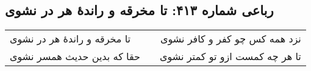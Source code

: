 \begin{center}
\section*{رباعی شماره ۴۱۳: تا مخرقه و راندهٔ هر در نشوی}
\label{sec:sh413}
\begin{longtable}{l p{0.5cm} r}
تا مخرقه و راندهٔ هر در نشوی
&&
نزد همه کس چو کفر و کافر نشوی
\\
حقا که بدین حدیث همسر نشوی
&&
تا هر چه کمست ازو تو کمتر نشوی
\\
\end{longtable}
\end{center}

